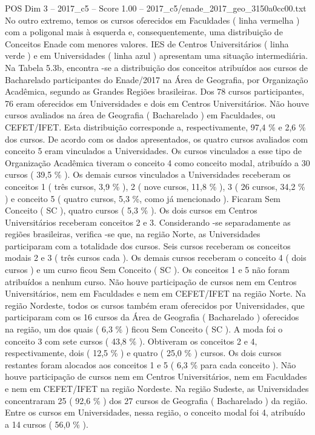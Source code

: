 \begin{textsample}{POS Dim 3 – 2017\_c5 – Score 1.00 – 2017\_c5/enade\_2017\_geo\_3150a0cc00.txt}
No outro extremo, temos os cursos oferecidos em Faculdades ( linha vermelha ) com a poligonal mais à esquerda e, consequentemente, uma distribuição de Conceitos Enade com menores valores.
IES de Centros Universitários ( linha verde ) e em Universidades ( linha azul ) apresentam uma situação intermediária.
Na Tabela 5.3b, encontra -se a distribuição dos conceitos atribuídos aos cursos de Bacharelado participantes do Enade/2017 na Área de Geografia, por Organização Acadêmica, segundo as Grandes Regiões brasileiras.
Dos 78 cursos participantes, 76 eram oferecidos em Universidades e dois em Centros Universitários.
Não houve cursos avaliados na área de Geografia ( Bacharelado ) em Faculdades, ou CEFET/IFET.
Esta distribuição corresponde a, respectivamente, 97,4 \% e 2,6 \% dos cursos.
De acordo com os dados apresentados, os quatro cursos avaliados com conceito 5 eram vinculados a Universidades.
Os cursos vinculados a esse tipo de Organização Acadêmica tiveram o conceito 4 como conceito modal, atribuído a 30 cursos ( 39,5 \% ).
Os demais cursos vinculados a Universidades receberam os conceitos 1 ( três cursos, 3,9 \% ), 2 ( nove cursos, 11,8 \% ), 3 ( 26 cursos, 34,2 \% ) e conceito 5 ( quatro cursos, 5,3 \%, como já mencionado ).
Ficaram Sem Conceito ( SC ), quatro cursos ( 5,3 \% ).
Os dois cursos em Centros Universitários receberam conceitos 2 e 3.
Considerando -se separadamente as regiões brasileiras, verifica -se que, na região Norte, as Universidades participaram com a totalidade dos cursos.
Seis cursos receberam os conceitos modais 2 e 3 ( três cursos cada ).
Os demais cursos receberam o conceito 4 ( dois cursos ) e um curso ficou Sem Conceito ( SC ).
Os conceitos 1 e 5 não foram atribuídos a nenhum curso.
Não houve participação de cursos nem em Centros Universitários, nem em Faculdades e nem em CEFET/IFET na região Norte.
Na região Nordeste, todos os cursos também eram oferecidos por Universidades, que participaram com os 16 cursos da Área de Geografia ( Bacharelado ) oferecidos na região, um dos quais ( 6,3 \% ) ficou Sem Conceito ( SC ).
A moda foi o conceito 3 com sete cursos ( 43,8 \% ).
Obtiveram os conceitos 2 e 4, respectivamente, dois ( 12,5 \% ) e quatro ( 25,0 \% ) cursos.
Os dois cursos restantes foram alocados aos conceitos 1 e 5 ( 6,3 \% para cada conceito ).
Não houve participação de cursos nem em Centros Universitários, nem em Faculdades e nem em CEFET/IFET na região Nordeste.
Na região Sudeste, as Universidades concentraram 25 ( 92,6 \% ) dos 27 cursos de Geografia ( Bacharelado ) da região.
Entre os cursos em Universidades, nessa região, o conceito modal foi 4, atribuído a 14 cursos ( 56,0 \% ).

\end{textsample}
